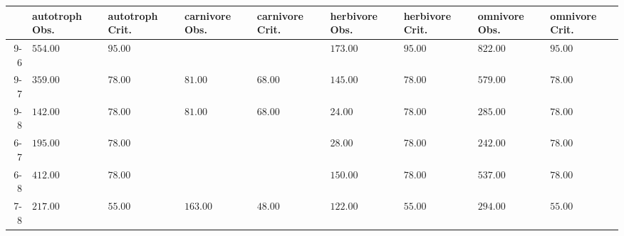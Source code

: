 \begin{table}[ht]
\centering
\begin{tabular}{rllllllll}
  \toprule
 & autotroph Obs. & autotroph Crit. & carnivore Obs. & carnivore Crit. & herbivore Obs. & herbivore Crit. & omnivore Obs. & omnivore Crit. \\ 
  \midrule
9-6 & \(\mathbf{554.00}\) & \(\mathbf{95.00}\) &  &  & \(\mathbf{173.00}\) & \(\mathbf{95.00}\) & \(\mathbf{822.00}\) & \(\mathbf{95.00}\) \\ 
  9-7 & \(\mathbf{359.00}\) & \(\mathbf{78.00}\) & \(\mathbf{81.00}\) & \(\mathbf{68.00}\) & \(\mathbf{145.00}\) & \(\mathbf{78.00}\) & \(\mathbf{579.00}\) & \(\mathbf{78.00}\) \\ 
  9-8 & \(\mathbf{142.00}\) & \(\mathbf{78.00}\) & \(\mathbf{81.00}\) & \(\mathbf{68.00}\) & 24.00 & 78.00 & \(\mathbf{285.00}\) & \(\mathbf{78.00}\) \\ 
  6-7 & \(\mathbf{195.00}\) & \(\mathbf{78.00}\) &  &  & 28.00 & 78.00 & \(\mathbf{242.00}\) & \(\mathbf{78.00}\) \\ 
  6-8 & \(\mathbf{412.00}\) & \(\mathbf{78.00}\) &  &  & \(\mathbf{150.00}\) & \(\mathbf{78.00}\) & \(\mathbf{537.00}\) & \(\mathbf{78.00}\) \\ 
  7-8 & \(\mathbf{217.00}\) & \(\mathbf{55.00}\) & \(\mathbf{163.00}\) & \(\mathbf{48.00}\) & \(\mathbf{122.00}\) & \(\mathbf{55.00}\) & \(\mathbf{294.00}\) & \(\mathbf{55.00}\) \\ 
   \bottomrule
\end{tabular}
\end{table}
